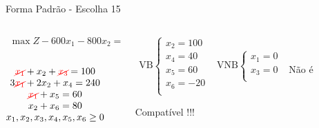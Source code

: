 \documentclass{beamer}
\begin{document}
\begin{frame}
{\begin{block}{Forma Padrão - {\color{cyan}Escolha 15}}
			\begin{columns}
				\begin{column}{0.35\textwidth}
					$
						\begin{matrix}
							\max Z - 600x_1 - 800x_2 = 0 \\
						\end{matrix}
					$ \\
					 \\
					$
						\begin{matrix}
							{\color{red}\cancel{x_1}}  + x_2  + {\color{red}\cancel{x_3}}                   = 100 \\
							3{\color{red}\cancel{x_1}} + 2x_2       + x_4             = 240 \\
							{\color{red}\cancel{x_1}}                    + x_5       = 60 \\
							x_2                           + x_6 = 80 \\
							x_1,x_2, x_3, x_4, x_5, x_6 \ge 0 \\
						\end{matrix}
					$
				\end{column}
				\vline
				\hspace{0.1cm}
				\begin{column}{0.45\textwidth}
						$
							\begin{matrix}
								\text{VB} \left\{  \begin{matrix}
																 x_2 = 100 \\
																 x_4 = 40 \\
																 x_5 = 60 \\
																 x_6 = -20 \\
												   \end{matrix} 
										   \right.
								&
								\text{VNB} \left\{  \begin{matrix}
																 x_1 = 0 \\
																 x_3 = 0 \\
												   \end{matrix} 
										   \right. 
								\\
							 & \\
							\end{matrix}
						$
						{\color{red}Não é Compatível !!!}
				\end{column}
			\end{columns}
		\end{block}
	}
\end{frame}
\end{document}
